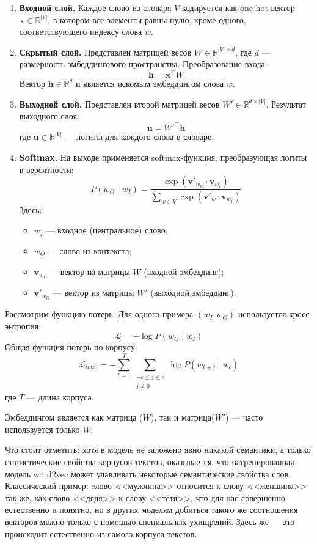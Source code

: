 \documentclass[coursework]{SCWorks}
\begin{document}
\begin{enumerate}
  \item \textbf{Входной слой.}  
  Каждое слово из словаря $V$ кодируется как one-hot вектор $\mathbf{x} \in \mathbb{R}^{|V|}$, в котором все элементы равны нулю, кроме одного, соответствующего индексу слова $w$.

  \item \textbf{Скрытый слой.}  
  Представлен матрицей весов $W \in \mathbb{R}^{|V| \times d}$, где $d$ — размерность эмбеддингового пространства. Преобразование входа:
  \[
  \mathbf{h} = \mathbf{x}^\top W
  \]
  Вектор $\mathbf{h} \in \mathbb{R}^d$ и является искомым эмбеддингом слова $w$.

  \item \textbf{Выходной слой.}  
  Представлен второй матрицей весов $W' \in \mathbb{R}^{d \times |V|}$. Результат выходного слоя:
  \[
  \mathbf{u} = W'^\top \mathbf{h}
  \]
  где $\mathbf{u} \in \mathbb{R}^{|V|}$ — логиты для каждого слова в словаре.

  \item \textbf{Softmax.}  
  На выходе применяется softmax-функция, преобразующая логиты в вероятности:
  \[
  P(w_O \mid w_I) = \frac{\exp(\mathbf{v}'_{w_O} \cdot \mathbf{v}_{w_I})}{\sum_{w \in V} \exp(\mathbf{v}'_w \cdot \mathbf{v}_{w_I})}
  \]
  Здесь:
  \begin{itemize}
    \item $w_I$ — входное (центральное) слово;
    \item $w_O$ — слово из контекста;
    \item $\mathbf{v}_{w_I}$ — вектор из матрицы $W$ (входной эмбеддинг);
    \item $\mathbf{v}'_{w_O}$ — вектор из матрицы $W'$ (выходной эмбеддинг).
  \end{itemize}
\end{enumerate}

Рассмотрим функцию потерь.
Для одного примера $(w_I, w_O)$ используется кросс-энтропия:
\[
\mathcal{L} = -\log P(w_O \mid w_I)
\]
Общая функция потерь по корпусу:
\[
\mathcal{L}_{\text{total}} = -\sum_{t=1}^{T} \sum_{\substack{-c \leq j \leq c \\ j \ne 0}} \log P(w_{t+j} \mid w_t)
\]
где $T$ — длина корпуса.

Эмбеддингом является как матрица ($W$), так и матрица($W'$) — часто используется только $W$. 

Что стоит отметить: хотя в модель не заложено явно никакой семантики, а только статистические свойства корпусов текстов, оказывается, что натренированная модель word2vec может улавливать некоторые семантические свойства слов. Классический пример: cлово <<мужчина>> относится к слову <<женщина>> так же, как слово <<дядя>> к слову <<тётя>>, что для нас совершенно естественно и понятно, но в других моделям добиться такого же соотношения векторов можно только с помощью специальных ухищрений. Здесь же — это происходит естественно из самого корпуса текстов.
\end{document}

